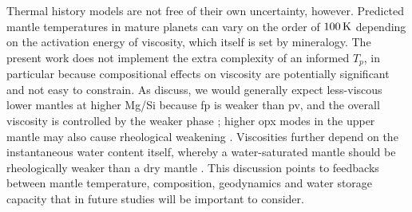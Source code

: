 \documentclass[fleqn,usenatbib]{mnras}
\begin{document}
Thermal history models are not free of their own uncertainty, however. Predicted mantle temperatures in mature planets can vary on the order of $100\,{\rm K}$ depending on the activation energy of viscosity, which itself is set by mineralogy. The present work does not implement the extra complexity of an informed $T_p$, in particular because compositional effects on viscosity are potentially significant and not easy to constrain. As \citet{spaargaren_influence_2020} discuss, we would generally expect less-viscous lower mantles at higher Mg/Si because fp is weaker than pv, and the overall viscosity is controlled by the weaker phase \citep{girard_shear_2016}; higher opx modes in the upper mantle may also cause rheological weakening \citep{tasaka_rheological_2020}. Viscosities further depend on the instantaneous water content itself, whereby a water-saturated mantle should be rheologically weaker than a dry mantle \citep{karato_rheology_1993}. This discussion points to feedbacks between mantle temperature, composition, geodynamics and water storage capacity that in future studies will be important to consider.

\end{document}
